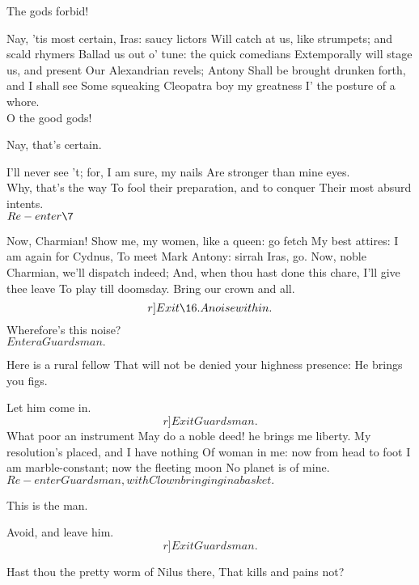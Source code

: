 \documentclass{book}
\begin{document}
	The gods forbid!

\2	Nay, 'tis most certain, Iras: saucy lictors
	Will catch at us, like strumpets; and scald rhymers
	Ballad us out o' tune: the quick comedians
	Extemporally will stage us, and present
	Our Alexandrian revels; Antony
	Shall be brought drunken forth, and I shall see
	Some squeaking Cleopatra boy my greatness
	I' the posture of a whore. \\

	O the good gods!

\2	Nay, that's certain.

	I'll never see 't; for, I am sure, my nails
	Are stronger than mine eyes. \\

\2	Why, that's the way
	To fool their preparation, and to conquer
	Their most absurd intents. \\

	\(Re-enter \7\)

		     Now, Charmian!
	Show me, my women, like a queen: go fetch
	My best attires: I am again for Cydnus,
	To meet Mark Antony: sirrah Iras, go.
	Now, noble Charmian, we'll dispatch indeed;
	And, when thou hast done this chare, I'll give thee leave
	To play till doomsday. Bring our crown and all.
	\[r]Exit \16. A noise within.\]
	Wherefore's this noise? \\

	\(Enter a Guardsman.\)

	Here is a rural fellow
	That will not be denied your highness presence:
	He brings you figs.

\2	Let him come in. \\	\[r]Exit Guardsman.\]
	What poor an instrument
	May do a noble deed! he brings me liberty.
	My resolution's placed, and I have nothing
	Of woman in me: now from head to foot
	I am marble-constant; now the fleeting moon
	No planet is of mine. \\

	\(Re-enter Guardsman, with Clown bringing in a basket.\)

	This is the man.

\2	Avoid, and leave him. \[r]Exit Guardsman.\]

	Hast thou the pretty worm of Nilus there,
	That kills and pains not?
\end{document}
